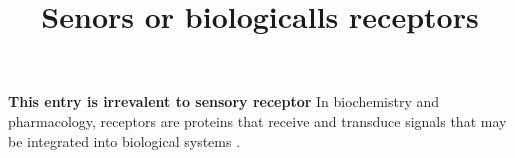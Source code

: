 \documentclass[a4paper]{article}
\title{Senors or biologicalls receptors}
\date{}
\begin{document}
    \maketitle
    \textbf{This entry is irrevalent to sensory receptor}  In biochemistry and pharmacology, receptors are proteins that receive and transduce signals that may be integrated into biological systems .
\end{document}
